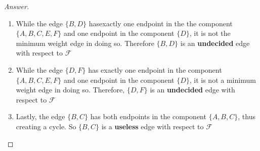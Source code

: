 \documentclass[11pt]{article}
\theoremstyle{definition}
\theoremstyle{definition}
\theoremstyle{definition}
\begin{document}
\begin{proof}[Answer]
\begin{enumerate}
\item While the edge $\{B,D\}$ hasexactly one endpoint in the the component $\{A,B,C,E,F\}$ and one endpoint in the component $\{D\}$, it is not the minimum weight edge in doing so. Therefore $\{B,D\}$ is an \textbf{undecided} edge with respect to  $\mathcal{F}$
\item While the edge $\{D,F\}$ has exactly one endpoint in the component $\{A,B,C,E,F\}$ and one endpoint in the component $\{D\}$, it is not a minimum weight edge in doing so. Therefore, $\{D,F\}$ is an \textbf{undecided} edge with respect to  $\mathcal{F}$
\item Lastly, the edge $\{B,C\}$ has both endpoints in the component  $\{A,B,C\}$, thus creating a cycle. So $\{B,C\}$ is a \textbf{useless} edge with respect to  $\mathcal{F}$
\end{enumerate}
\end{proof}




\end{document}
